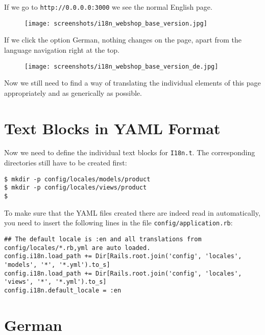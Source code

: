 \documentclass[a4paper]{book}
\begin{document}
If we go to \texttt{http://0.0.0.0:3000} we see the normal English page.

\begin{figure}[htbp]
\centering
\texttt{[image: screenshots/i18n\_webshop\_base\_version.jpg]}
\end{figure}

If we click the option German, nothing changes on the page, apart from the language navigation right at the top.

\begin{figure}[htbp]
\centering
\texttt{[image: screenshots/i18n\_webshop\_base\_version\_de.jpg]}
\end{figure}

Now we still need to find a way of translating the individual elements of this page appropriately and as generically as possible.

\section{Text Blocks in YAML Format}\label{text-blocks-in-yaml-format}

Now we need to define the individual text blocks for \texttt{I18n.t}. The corresponding directories still have to be created first:

\begin{shaded}\begin{verbatim}
$ mkdir -p config/locales/models/product
$ mkdir -p config/locales/views/product
$
\end{verbatim}\end{shaded}

To make sure that the YAML files created there are indeed read in automatically, you need to insert the following lines in the file \texttt{config/application.rb}:

\begin{shaded}\begin{verbatim}
## The default locale is :en and all translations from config/locales/*.rb,yml are auto loaded.
config.i18n.load_path += Dir[Rails.root.join('config', 'locales', 'models', '*', '*.yml').to_s]
config.i18n.load_path += Dir[Rails.root.join('config', 'locales', 'views', '*', '*.yml').to_s]
config.i18n.default_locale = :en
\end{verbatim}\end{shaded}

\section{German}\label{german}
\end{document}
